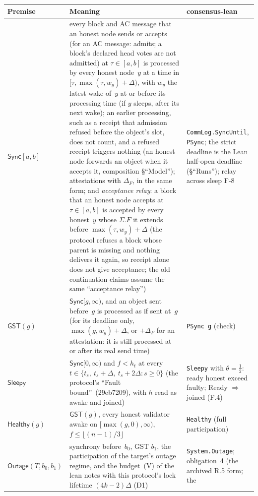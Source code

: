 \documentclass{article}
\begin{document}
\begin{longtable}{@{}>{\raggedright\arraybackslash}p{2.2cm}>{\raggedright\arraybackslash}p{6.4cm}>{\raggedright\arraybackslash}p{4.6cm}@{}}
\hline
Premise & Meaning & consensus-lean\\
\hline
$\mathsf{Sync}[a,b]$ & every block and AC message that an honest node sends
  or accepts (for an AC message: admits; a block's declared head votes are not
  admitted) at $\tau\in[a,b]$ is processed by
  every honest node~$y$ at a time in $[\tau,\max(\tau,w_y)+\Delta)$, with $w_y$
  the latest wake of~$y$ at or before its processing time (if $y$ sleeps,
  after its next wake); an earlier processing, such as a receipt that
  admission refused before the object's slot, does not count, and a refused
  receipt triggers nothing (an honest node forwards an object when it accepts
  it, composition \S``Model'');
  attestations with $\Delta_F$, in the same form; and \emph{acceptance relay}: a block that an
  honest node accepts at $\tau\in[a,b]$ is accepted by every honest~$y$ whose
  $\Sigma.F$ it extends before $\max(\tau,w_y)+\Delta$ (the protocol refuses a
  block whose parent is missing and nothing delivers it again, so receipt
  alone does not give acceptance; the old continuation claims assume the same
  ``acceptance relay'') &
  \texttt{CommLog.SyncUntil}, \texttt{PSync}; the strict deadline is the
  Lean half-open deadline (\S``Runs''); relay across sleep F-8\\
$\mathsf{GST}(g)$ & $\mathsf{Sync}[g,\infty)$, and an object sent before~$g$
  is processed as if sent at~$g$ (for its deadline only, $\max(g,w_y)+\Delta$,
  or $+\Delta_F$ for an attestation: it is still processed at or after its
  real send time) & \texttt{PSync g} (check)\\
$\mathsf{Sleepy}$ & $\mathsf{Sync}[0,\infty)$ and $f<h_t$ at every
  $t\in\{t_s,\ t_s+\Delta,\ t_s+2\Delta : s\geq0\}$ (the protocol's ``Fault bound''~(29eb7209), with $h$ read
  as awake and joined) &
  \texttt{Sleepy} with $\theta=\tfrac12$: ready honest exceed faulty; Ready
  $\Rightarrow$ joined (F.4)\\
$\mathsf{Healthy}(g)$ & $\mathsf{GST}(g)$, every honest validator awake on
  $[\max(g,0),\infty)$, $f\leq\lfloor(n-1)/3\rfloor$ & \texttt{Healthy}
  (full participation)\\
$\mathsf{Outage}(T,b_0,b_1)$ & synchrony before~$b_0$, GST $b_1$, the
  participation of the target's outage regime, and the budget~(V) of the lean
  notes with this protocol's lock lifetime $(4k-2)\Delta$ (D1) &
  \texttt{System.Outage}; obligation~4 (the archived R.5 form; the

\end{longtable}
\end{document}
